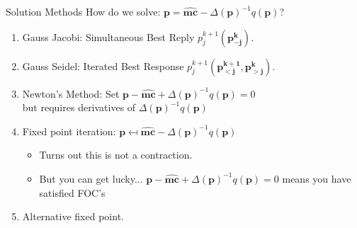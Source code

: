 \documentclass[aspectratio=169,10pt]{beamer}
\begin{document}
\begin{frame}{Solution Methods}
How do we solve: $\symbf{p} = \widehat{\symbf{mc}} - \Delta(\symbf{p})^{-1}q(\symbf{p})$?
\begin{enumerate}
\item Gauss Jacobi: Simultaneous Best Reply  $p_j^{k+1}(\symbf{p_{-j}^k})$.
\item Gauss Seidel: Iterated Best Response  $p_j^{k+1}(\symbf{p_{<j}^{k+1}},\symbf{p_{>j}^{k}})$.
\item Newton's Method: Set $\symbf{p} - \widehat{\symbf{mc}} + \Delta(\symbf{p})^{-1}q(\symbf{p})=0$\\ but requires derivatives of $\Delta(\symbf{p})^{-1}q(\symbf{p})$
\item Fixed point iteration: $\symbf{p} \mapsfrom \widehat{\symbf{mc}} - \Delta(\symbf{p})^{-1}q(\symbf{p})$
\begin{itemize}
\item Turns out this is \alert{not a contraction}.
\item But you can get lucky... $\symbf{p} - \widehat{\symbf{mc}} + \Delta(\symbf{p})^{-1}q(\symbf{p})=0$ means you have satisfied FOC's
\end{itemize}
\item Alternative fixed point.
\end{enumerate}
\end{frame} 
\end{document}
